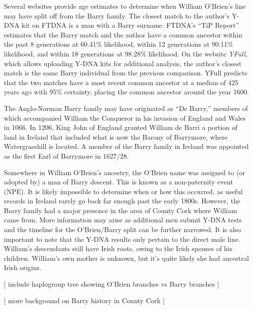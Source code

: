 Several websites provide age estimates to determine when William O'Brien's line may have split off from the Barry family. The closest match to the author's Y-DNA kit on FTDNA is a man with a Barry surname. FTDNA's ``TiP Report'' estimates that the Barry match and the author have a common ancestor within the past 8 generations at 60.41\% likelihood, within 12 generations at 90.11\% likelihood, and within 18 generations at 98.28\% likelihood.\cite{TiP} On the website \textit{YFull}, which allows uploading Y-DNA kits for additional analysis, the author's closest match is the same Barry individual from the previous comparison. YFull predicts that the two matches have a most recent common ancestor at a median of 425 years ago with 95\% certainty, placing the common ancestor around the year 1600.\cite{YFull}

The Anglo-Norman Barry family may have originated as ``De Barry,'' members of which accompanied William the Conqueror in his invasion of England and Wales in 1066.\cite{BarryHistory1} In 1206, King John of England granted William de Barri a portion of land in Ireland that included what is now the Barony of Barrymore, where Watergrasshill is located.\cite{BarryHistory17} A member of the Barry family in Ireland was appointed as the first Earl of Barrymore in 1627/28.\cite{ParliamentaryGazetteer}

Somewhere in William O'Brien's ancestry, the O'Brien name was assigned to (or adopted by) a man of Barry descent. This is known as a non-paternity event (NPE). It is likely impossible to determine when or how this occurred, as useful records in Ireland rarely go back far enough past the early 1800s. However, the Barry family had a major presence in the area of County Cork where William came from. More information may arise as additional men submit Y-DNA tests and the timeline for the O'Brien/Barry split can be further narrowed. It is also important to note that the Y-DNA results only pertain to the direct male line. William's descendants still have Irish roots, owing to the Irish spouses of his children. William's own mother is unknown, but it's quite likely she had ancestral Irish origins.

[ include haplogroup tree showing O'Brien branches vs Barry branches ]

[ more background on Barry history in County Cork ]